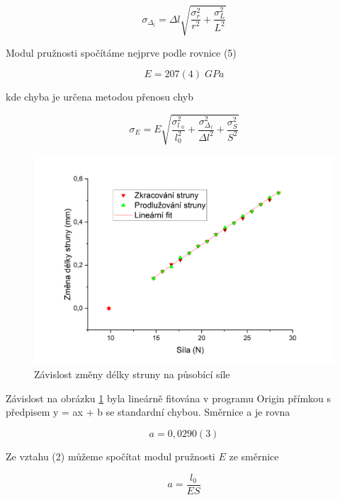 \begin{equation}
    \sigma_\Delta_l = \Delta l \sqrt{\frac{\sigma^2_r}{r^2}+\frac{\sigma^2_L}{L^2}}
\end{equation}

Modul pružnosti spočítáme nejprve podle rovnice (5)

\begin{equation}
    \nonumber
    E = 207(4) \; GPa
\end{equation}

kde chyba je určena metodou přenosu chyb

\begin{equation}
    \sigma_E = E \sqrt{\frac{\sigma^2_l__0}{l^2_0}+\frac{\sigma^2_\Delta__l}{\Delta l^2}+\frac{\sigma^2_S}{S^2}}
\end{equation}

\begin{figure}[h]
    \centering
    \includegraphics[width=0.85\linewidth]{09 - Měření modulu pružnosti v tahu//Protokol_modul pružnosti//img/Změna délky struny.png}
    \caption{Závislost změny délky struny na působící síle}
    \label{fig:delka-struny}
\end{figure}

Závislost na obrázku \ref{fig:delka-struny} byla lineárně fitována v programu Origin přímkou s předpisem y = ax + b se standardní chybou. Směrnice a je rovna

\begin{equation}
    \nonumber
    a = 0,0290(3)
\end{equation}

Ze vztahu (2) můžeme spočítat modul pružnosti \(E\) ze směrnice

\begin{equation}
    \nonumber
    a = \frac{l_0}{ES}
\end{equation}

